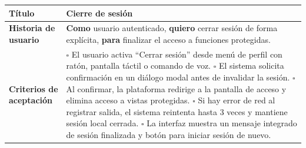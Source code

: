 \documentclass{article}
\newcommand{\story}[3]{
\begin{table}[H]
    \centering
    \begin{tabularx}{\textwidth}{| >{\raggedright\arraybackslash\bfseries\columncolor{leftheaderbg}}p{2.5cm} | >{\raggedright\arraybackslash\columncolor{contentbg}}X |}
        \hline
        Título & #1 \\
        \hline
        Historia de usuario & #2 \\
        \hline
        Criterios de aceptación & #3 \\
        \hline
    \end{tabularx}
\end{table}
}
\begin{document}
\story
{Cierre de sesión}
{\textbf{Como} usuario autenticado, \textbf{quiero} cerrar sesión de forma explícita, \textbf{para} finalizar el acceso a funciones protegidas.}
{$\square$ El usuario activa ``Cerrar sesión'' desde menú de perfil con ratón, pantalla táctil o comando de voz. \newline
$\square$ El sistema solicita confirmación en un diálogo modal antes de invalidar la sesión. \newline
$\square$ Al confirmar, la plataforma redirige a la pantalla de acceso y elimina acceso a vistas protegidas. \newline
$\square$ Si hay error de red al registrar salida, el sistema reintenta hasta 3 veces y mantiene sesión local cerrada. \newline
$\square$ La interfaz muestra un mensaje integrado de sesión finalizada y botón para iniciar sesión de nuevo.}
\end{document}
